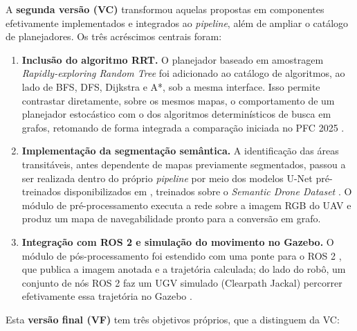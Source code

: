 \documentclass[
    12pt,
    openright,
    oneside,
    a4paper,
    english,
    brazil
]{abntex2}
\begin{document}
A \textbf{segunda versão (VC)} transformou aquelas propostas em componentes efetivamente implementados e integrados ao \textit{pipeline}, além de ampliar o catálogo de planejadores. Os três acréscimos centrais foram:

\begin{enumerate}
    \item \textbf{Inclusão do algoritmo RRT.} O planejador baseado em amostragem \textit{Rapidly-exploring Random Tree} \cite{lavalle1998} foi adicionado ao catálogo de algoritmos, ao lado de BFS, DFS, Dijkstra e A*, sob a mesma interface. Isso permite contrastar diretamente, sobre os mesmos mapas, o comportamento de um planejador estocástico com o dos algoritmos determinísticos de busca em grafos, retomando de forma integrada a comparação iniciada no PFC 2025 \cite{camelo2025}.

    \item \textbf{Implementação da segmentação semântica.} A identificação das áreas transitáveis, antes dependente de mapas previamente segmentados, passou a ser realizada dentro do próprio \textit{pipeline} por meio dos modelos U-Net pré-treinados disponibilizados em \cite{junior2024_models}, treinados sobre o \emph{Semantic Drone Dataset} \cite{drone_dataset}. O módulo de pré-processamento executa a rede sobre a imagem RGB do UAV e produz um mapa de navegabilidade pronto para a conversão em grafo.

    \item \textbf{Integração com ROS 2 e simulação do movimento no Gazebo.} O módulo de pós-processamento foi estendido com uma ponte para o ROS 2 \cite{quigley2009}, que publica a imagem anotada e a trajetória calculada; do lado do robô, um conjunto de nós ROS 2 faz um UGV simulado (Clearpath Jackal) percorrer efetivamente essa trajetória no Gazebo \cite{koenig2004}.
\end{enumerate}

Esta \textbf{versão final (VF)} tem três objetivos próprios, que a distinguem da VC:
\end{document}
